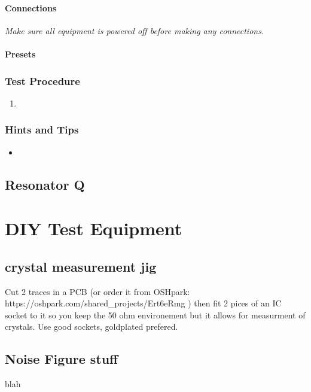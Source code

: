 \documentclass[10pt,letterpaper]{book}
\begin{document}
\subsubsection*{Connections}
\emph{Make sure all equipment is powered off before making any connections.}
\begin{itemize}

\end{itemize}
\subsubsection*{Presets}
\begin{itemize}

\end{itemize}
\subsection*{Test Procedure}
\begin{enumerate}
\item  
\end{enumerate}

\subsection*{Hints and Tips}
\begin{itemize}
\item
\end{itemize}


\section{Resonator Q}
\chapter{DIY Test Equipment}
\section{crystal measurement jig}
Cut 2 traces in a PCB (or order it from OSHpark: https://oshpark.com/shared_projects/Ert6eRmg ) then fit 2 pices of an IC socket to it so you keep the 50 ohm environement but it allows for measurment of crystals. Use good sockets, goldplated prefered.  
\section{Noise Figure stuff}
blah
\end{document}
